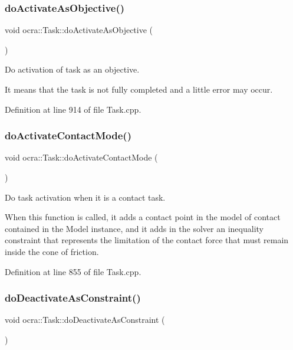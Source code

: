 \subsubsection{\texorpdfstring{do\+Activate\+As\+Objective()}{doActivateAsObjective()}}
{\footnotesize\ttfamily void ocra\+::\+Task\+::do\+Activate\+As\+Objective (\begin{DoxyParamCaption}{ }\end{DoxyParamCaption})\hspace{0.3cm}{\ttfamily [protected]}}

Do activation of task as an objective.

It means that the task is not fully completed and a little error may occur. 

Definition at line 914 of file Task.\+cpp.

\hypertarget{classocra_1_1Task_acbee7ddb69459ff0d2e450dbe6195b49}{}\label{classocra_1_1Task_acbee7ddb69459ff0d2e450dbe6195b49} 
\subsubsection{\texorpdfstring{do\+Activate\+Contact\+Mode()}{doActivateContactMode()}}
{\footnotesize\ttfamily void ocra\+::\+Task\+::do\+Activate\+Contact\+Mode (\begin{DoxyParamCaption}{ }\end{DoxyParamCaption})\hspace{0.3cm}{\ttfamily [protected]}}

Do task activation when it is a contact task.

When this function is called, it adds a contact point in the model of contact contained in the Model instance, and it adds in the solver an inequality constraint that represents the limitation of the contact force that must remain inside the cone of friction. 

Definition at line 855 of file Task.\+cpp.

\hypertarget{classocra_1_1Task_a9f7261991e6aa056a02ec7f3dd4ea72a}{}\label{classocra_1_1Task_a9f7261991e6aa056a02ec7f3dd4ea72a} 
\subsubsection{\texorpdfstring{do\+Deactivate\+As\+Constraint()}{doDeactivateAsConstraint()}}
{\footnotesize\ttfamily void ocra\+::\+Task\+::do\+Deactivate\+As\+Constraint (\begin{DoxyParamCaption}{ }\end{DoxyParamCaption})\hspace{0.3cm}{\ttfamily [protected]}}

